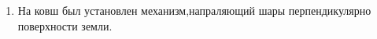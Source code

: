 \begin{enumerate}
	\item На ковш был установлен механизм,напраляющий шары перпендикулярно поверхности земли.
	\begin{figure}[H]
		\begin{minipage}[h]{0.31\linewidth}
		\end{minipage}
		\hfill
		\begin{minipage}[h]{0.31\linewidth}

\end{minipage}
\end{figure}
\end{enumerate}
